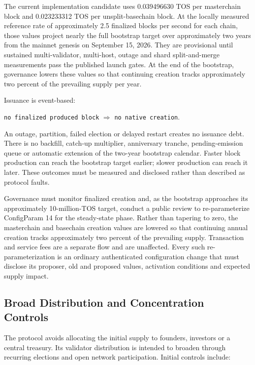\documentclass[11pt,oneside]{article}
\begin{document}
The current implementation candidate uses 0.039496630 TOS per masterchain block and
0.023233312 TOS per unsplit-basechain block. At the locally measured reference rate of
approximately 2.5 finalized blocks per second for each chain, those values project nearly
the full bootstrap target over approximately two years from the mainnet genesis on
September 15, 2026. They are provisional until sustained multi-validator, multi-host, outage
and shard split-and-merge measurements pass the published launch gates. At the end of the
bootstrap, governance lowers these values so that continuing creation tracks approximately
two percent of the prevailing supply per year.

Issuance is event-based:

\begin{center}
\texttt{no finalized produced block} $\Longrightarrow$ \texttt{no native creation}.
\end{center}

An outage, partition, failed election or delayed restart creates no issuance debt. There is
no backfill, catch-up multiplier, anniversary tranche, pending-emission queue or automatic
extension of the two-year bootstrap calendar. Faster block production can reach the bootstrap
target earlier; slower production can reach it later. These outcomes must be measured and
disclosed rather than described as protocol faults.

Governance must monitor finalized creation and, as the bootstrap approaches its
approximately 10-million-TOS target, conduct a public review to re-parameterize ConfigParam
14 for the steady-state phase. Rather than tapering to zero, the masterchain and basechain
creation values are lowered so that continuing annual creation tracks approximately two
percent of the prevailing supply. Transaction and service fees are a separate flow and are
unaffected. Every such re-parameterization is an ordinary authenticated configuration change
that must disclose its proposer, old and proposed values, activation conditions and expected
supply impact.

\subsection{Broad Distribution and Concentration Controls}

The protocol avoids allocating the initial supply to founders, investors or a central
treasury. Its validator distribution is intended to broaden through recurring elections and
open network participation. Initial controls include:
\end{document}
